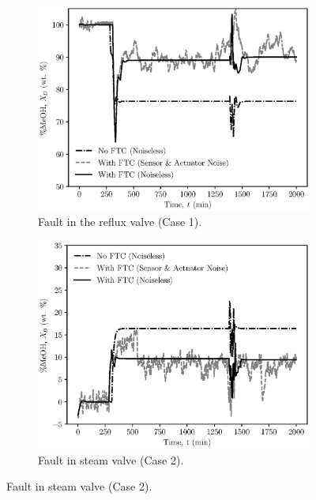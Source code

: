 \begin{figure}[h]
    \begin{center}
    \begin{subfigure}[b]{0.49\textwidth}
        \includegraphics[width=\textwidth]{images/ftc/Case1_Plot.eps}
        \caption{\label{fig:case_study1} Fault in the reflux valve (Case 1).}
    \end{subfigure}
    \hfill
    \begin{subfigure}[b]{0.49\textwidth}
        \includegraphics[width=\textwidth]{images/ftc/Case2_Plot.eps}
        \caption{\label{fig:case_study2} Fault in steam valve (Case 2).}
    \end{subfigure}
    \end{center}
\end{figure}

